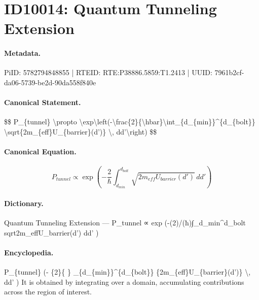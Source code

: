 \section*{ID10014: Quantum Tunneling Extension}
\paragraph{Metadata.}
PiID: 5782794848855 | RTEID: RTE:P38886.5859:T1.2413 | UUID: 7961b2cf-da06-5739-be2d-90da558f840e

\paragraph{Canonical Statement.}
\$\$ P\_\{tunnel\} \textbackslash{}propto \textbackslash{}exp\textbackslash{}left(-\textbackslash{}frac\{2\}\{\textbackslash{}hbar\}\textbackslash{}int\_\{d\_\{min\}\}\textasciicircum{}\{d\_\{bolt\}\} \textbackslash{}sqrt\{2m\_\{eff\}U\_\{barrier\}(d')\} \textbackslash{}, dd'\textbackslash{}right) \$\$

\paragraph{Canonical Equation.}
\[
P_{tunnel} \propto \exp\left(-\frac{2}{\hbar}\int_{d_{min}}^{d_{bolt}} \sqrt{2m_{eff}U_{barrier}(d')} \, dd'\right)
\]

\paragraph{Dictionary.}
Quantum Tunneling Extension — P\_tunnel ∝ exp (-(2)/(ħ)∫\_d\_min\textasciicircum{}d\_bolt sqrt2m\_effU\_barrier(d') dd' )

\paragraph{Encyclopedia.}
P\_\{tunnel\} (- \{2\}\{ \} \_\{d\_\{min\}\}\textasciicircum{}\{d\_\{bolt\}\} \{2m\_\{eff\}U\_\{barrier\}(d')\} \textbackslash{}, dd' ) It is obtained by integrating over a domain, accumulating contributions across the region of interest.
